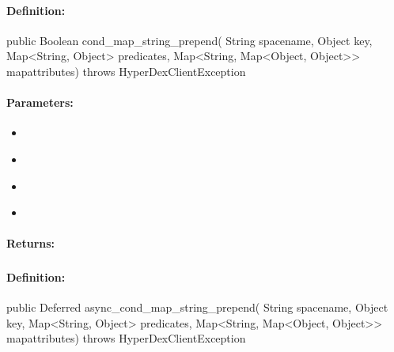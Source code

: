 \paragraph{Definition:}
\begin{javacode}
public Boolean cond_map_string_prepend(
        String spacename,
        Object key,
        Map<String, Object> predicates,
        Map<String, Map<Object, Object>> mapattributes) throws HyperDexClientException
\end{javacode}

\paragraph{Parameters:}
\begin{itemize}[noitemsep]
\item {}\\

\item {}\\

\item {}\\

\item {}\\

\end{itemize}

\paragraph{Returns:}


\pagebreak
\subsubsection{}
\label{api:java:async_cond_map_string_prepend}


\paragraph{Definition:}
\begin{javacode}
public Deferred async_cond_map_string_prepend(
        String spacename,
        Object key,
        Map<String, Object> predicates,
        Map<String, Map<Object, Object>> mapattributes) throws HyperDexClientException
\end{javacode}

